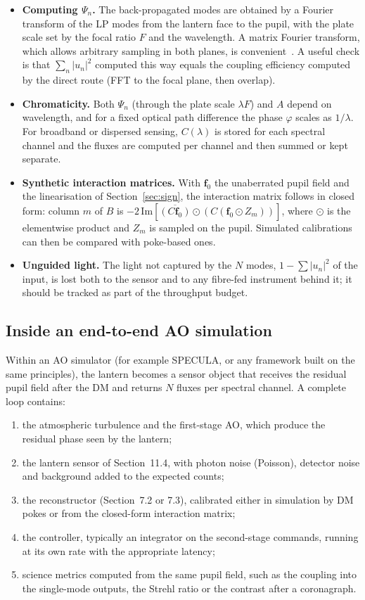 \documentclass[11pt,a4paper]{article}
\newcommand{\fvec}{\mathbf{f}}
\begin{document}
\begin{itemize}
\item \textbf{Computing $\Psi_n$.} The back-propagated modes are obtained by a Fourier transform of the LP modes from the lantern face to the pupil, with the plate scale set by the focal ratio $F$ and the wavelength. A matrix Fourier transform, which allows arbitrary sampling in both planes, is convenient~\cite{Soummer2007}. A useful check is that $\sum_n |u_n|^2$ computed this way equals the coupling efficiency computed by the direct route (FFT to the focal plane, then overlap).
\item \textbf{Chromaticity.} Both $\Psi_n$ (through the plate scale $\lambda F$) and $A$ depend on wavelength, and for a fixed optical path difference the phase $\varphi$ scales as $1/\lambda$. For broadband or dispersed sensing, $C(\lambda)$ is stored for each spectral channel and the fluxes are computed per channel and then summed or kept separate.
\item \textbf{Synthetic interaction matrices.} With $\fvec_0$ the unaberrated pupil field and the linearisation of Section~\ref{sec:sign}, the interaction matrix follows in closed form: column $m$ of $B$ is $-2\,\mathrm{Im}[\overline{(C\fvec_0)} \odot (C(\fvec_0 \odot Z_m))]$, where $\odot$ is the elementwise product and $Z_m$ is sampled on the pupil. Simulated calibrations can then be compared with poke-based ones.
\item \textbf{Unguided light.} The light not captured by the $N$ modes, $1 - \sum |u_n|^2$ of the input, is lost both to the sensor and to any fibre-fed instrument behind it; it should be tracked as part of the throughput budget.
\end{itemize}

\subsection{Inside an end-to-end AO simulation}
Within an AO simulator (for example SPECULA, or any framework built on the same principles), the lantern becomes a sensor object that receives the residual pupil field after the DM and returns $N$ fluxes per spectral channel. A complete loop contains:
\begin{enumerate}
\item the atmospheric turbulence and the first-stage AO, which produce the residual phase seen by the lantern;
\item the lantern sensor of Section~11.4, with photon noise (Poisson), detector noise and background added to the expected counts;
\item the reconstructor (Section~7.2 or 7.3), calibrated either in simulation by DM pokes or from the closed-form interaction matrix;
\item the controller, typically an integrator on the second-stage commands, running at its own rate with the appropriate latency;
\item science metrics computed from the same pupil field, such as the coupling into the single-mode outputs, the Strehl ratio or the contrast after a coronagraph.
\end{enumerate}
\end{document}
